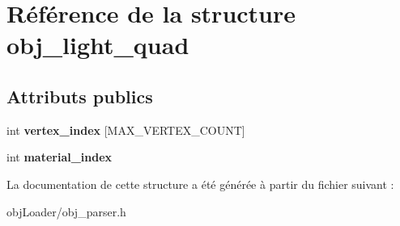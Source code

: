 \hypertarget{structobj__light__quad}{\section{Référence de la structure obj\-\_\-light\-\_\-quad}
\label{structobj__light__quad}
}
\subsection*{Attributs publics}
\begin{DoxyCompactItemize}
\item 
\hypertarget{structobj__light__quad_a1ed9f7f7a517ab90f2b8c6b515f3654e}{int {\bfseries vertex\-\_\-index} \mbox{[}M\-A\-X\-\_\-\-V\-E\-R\-T\-E\-X\-\_\-\-C\-O\-U\-N\-T\mbox{]}}\label{structobj__light__quad_a1ed9f7f7a517ab90f2b8c6b515f3654e}

\item 
\hypertarget{structobj__light__quad_ad12afb43f3ca35ebd6c6e3a81063edb2}{int {\bfseries material\-\_\-index}}\label{structobj__light__quad_ad12afb43f3ca35ebd6c6e3a81063edb2}

\end{DoxyCompactItemize}


La documentation de cette structure a été générée à partir du fichier suivant \-:\begin{DoxyCompactItemize}
\item 
obj\-Loader/obj\-\_\-parser.\-h\end{DoxyCompactItemize}

